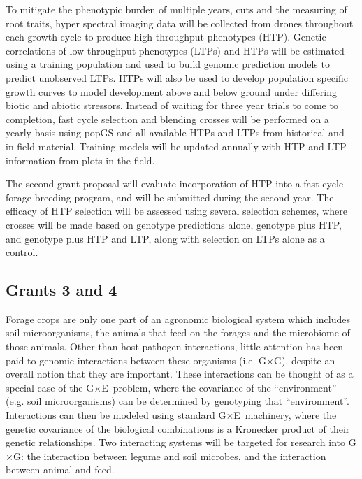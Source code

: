 \documentclass[10pt]{article}
\newcommand{\gxe}{G$\times$E}
\newcommand{\gxg}{G$\times$G}
\begin{document}
To mitigate the phenotypic burden of multiple years, cuts and the measuring of root traits, hyper spectral imaging data will be collected from drones throughout each growth cycle to produce high throughput phenotypes (HTP). Genetic correlations of low throughput phenotypes (LTPs) and HTPs will be estimated using a training population and used to build genomic prediction models to predict unobserved LTPs. HTPs will also be used to develop population specific growth curves to model development above and below ground under differing biotic and abiotic stressors. Instead of waiting for three year trials to come to completion, fast cycle selection and blending crosses will be performed on a yearly basis using popGS and all available HTPs and LTPs from historical and in-field material. Training models will be updated annually with HTP and LTP information from plots in the field. 

The second grant proposal will evaluate incorporation of HTP into a fast cycle forage breeding program, and will be submitted during the second year. The efficacy of HTP selection will be assessed using several selection schemes, where crosses will be made based on genotype predictions alone, genotype plus HTP, and genotype plus HTP and LTP, along with selection on LTPs alone as a control.   

\subsection*{Grants 3 and 4}

Forage crops are only one part of an agronomic biological system which includes soil microorganisms, the animals that feed on the forages and the microbiome of those animals. Other than host-pathogen interactions, little attention has been paid to genomic interactions between these organisms (i.e. \gxg), despite an overall notion that they are important. These interactions can be thought of as a special case of the \gxe\ problem, where the covariance of the ``environment'' (e.g. soil microorganisms) can be determined by genotyping that ``environment''. Interactions can then be modeled using standard \gxe\ machinery, where the genetic covariance of the biological combinations is a Kronecker product of their genetic relationships. Two interacting systems will be targeted for research into \gxg: the interaction between legume and soil microbes, and the interaction between animal and feed. 
\end{document}
